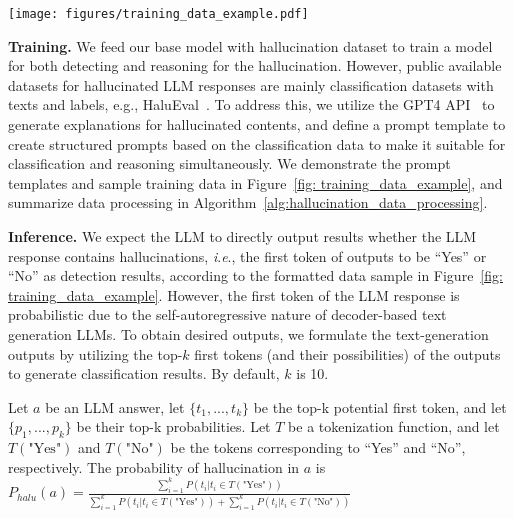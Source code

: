 \begin{figure*}
  \centering
  \texttt{[image: figures/training\_data\_example.pdf]}
  \caption{Prompt templates and sample training data for hallucination detection and reasoning.}
  \label{fig: training_data_example}
\end{figure*}

\textbf{Training. }
We feed our base model with hallucination dataset to train a model for both detecting and reasoning for the hallucination. %
However, public available datasets for hallucinated LLM responses are mainly classification datasets with texts and labels, e.g., HaluEval~\citep{li2023halueval}. To address this, we utilize the GPT4 API~\citep{openai-data-paper} to generate explanations for hallucinated contents, and
define a prompt template
to create structured prompts based on the classification data to make it suitable for classification and reasoning simultaneously. 
We demonstrate the prompt templates and sample training data in Figure~\ref{fig: training_data_example}, and summarize data processing in Algorithm~\ref{alg:hallucination_data_processing}. 







\textbf{Inference. }
We expect the LLM to directly output results whether the LLM response contains hallucinations, \textit{i}.\textit{e}., the first token of outputs to be ``Yes'' or ``No'' as detection results, according to the formatted data sample in Figure~\ref{fig: training_data_example}. However, the first token of the LLM response is probabilistic due to the self-autoregressive nature of decoder-based text generation LLMs. 
To obtain desired outputs, we formulate the text-generation outputs by utilizing the top-$k$ first tokens (and their possibilities) of the outputs to generate classification results. By default, $k$ is 10. 

\begin{definition}
Let $a$ be an LLM answer, let $\{t_1, ..., t_{k}\}$ be the top-k potential first token, and let $\{p_1, ..., p_{k}\}$  be their top-k probabilities. Let $T$ be a tokenization function, and let $T(\text{"Yes"})$ and $T(\text{"No"})$ be the tokens corresponding to ``Yes'' and ``No'', respectively. The probability of hallucination in $a$ is
$P_\mathit{halu}(a) = \frac{\sum_{i=1}^{k} P(t_i | t_i\in T(\text{"Yes"}))}{\sum_{i=1}^{k} P(t_i | t_i\in T(\text{"Yes"})) + \sum_{i=1}^{k} P(t_i | t_i\in T(\text{"No"}))}
$   
\end{definition}\label{def:halu_prob}


